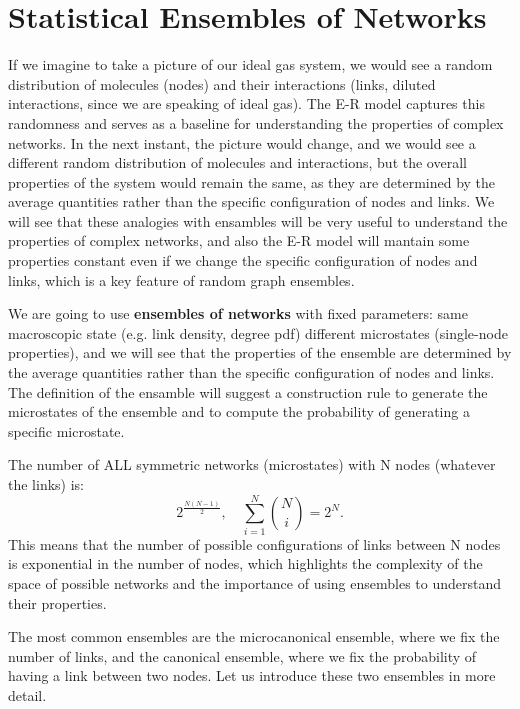 \section{Statistical Ensembles of Networks}

If we imagine to take a picture of our ideal gas system, we would see a random distribution of molecules (nodes) and their interactions (links, diluted interactions, since we are speaking of ideal gas). The E-R model captures this randomness and serves as a baseline for understanding the properties of complex networks. In the next instant, the picture would change, and we would see a different random distribution of molecules and interactions, but the overall properties of the system would remain the same, as they are determined by the average quantities rather than the specific configuration of nodes and links. We will see that these analogies with ensambles will be very useful to understand the properties of complex networks, and also the E-R model will mantain some properties constant even if we change the specific configuration of nodes and links, which is a key feature of random graph ensembles.

We are going to use \textbf{ensembles of networks} with fixed parameters: same macroscopic state (e.g. link density, degree pdf) different microstates (single-node properties), and we will see that the properties of the ensemble are determined by the average quantities rather than the specific configuration of nodes and links.
The definition of the ensamble will suggest a construction rule to generate the microstates of the ensemble and to compute the probability of generating a specific microstate.

\begin{remark}
    The number of ALL symmetric networks (microstates) with N nodes (whatever the links) is:
    \[
        2^{\frac{N(N-1)}{2}}, \quad \sum_{i=1}^{N} \binom{N}{i} = 2^N.
    \]
    This means that the number of possible configurations of links between N nodes is exponential in the number of nodes, which highlights the complexity of the space of possible networks and the importance of using ensembles to understand their properties.
\end{remark}

The most common ensembles are the microcanonical ensemble, where we fix the number of links, and the canonical ensemble, where we fix the probability of having a link between two nodes. Let us introduce these two ensembles in more detail.


